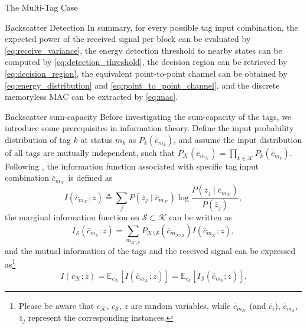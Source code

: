 \documentclass[journal]{IEEEtran}
\begin{document}
\begin{section}{The Multi-Tag Case}
\begin{subsection}{Backscatter Detection}
			In summary, for every possible tag input combination, the expected power of the received signal per block can be evaluated by \eqref{eq:receive_variance}, the energy detection threshold to nearby states can be computed by \eqref{eq:detection_threshold}, the decision region can be retrieved by \eqref{eq:decision_region}, the equivalent point-to-point channel can be obtained by \eqref{eq:energy_distribution} and \eqref{eq:point_to_point_channel}, and the discrete memoryless MAC can be extracted by \eqref{eq:mac}.
		\end{subsection}

		\begin{subsection}{Backscatter sum-capacity}
			Before investigating the sum-capacity of the tags, we introduce some prerequisites in information theory. Define the input probability distribution of tag $k$ at status $m_k$ as $P_k(\bar{c}_{m_k})$, and assume the input distribution of all tags are mutually independent, such that $P_{\mathcal{K}}(\bar{c}_{m_{\mathcal{K}}}) = \prod_{k \in \mathcal{K}} P_k(\bar{c}_{m_k})$. Following \cite{Rezaeian2004}, the information function associated with specific tag input combination $\bar{c}_{m_{\mathcal{K}}}$ is defined as
			\begin{equation}
				I(\bar{c}_{m_{\mathcal{K}}} ; z) \triangleq \sum_j P(\bar{z}_j \mid \bar{c}_{m_{\mathcal{K}}}) \log \frac{P(\bar{z}_j \mid \bar{c}_{m_{\mathcal{K}}})}{P(\bar{z}_j)},
				\label{eq:information_function}
			\end{equation}
			the marginal information function on $\mathcal{S} \subset \mathcal{K}$ can be written as
			\begin{equation}
				I_{\mathcal{S}}(\bar{c}_{m_{\mathcal{S}}} ; z) = \sum_{m_{\mathcal{K} \setminus \mathcal{S}}} P_{\mathcal{K} \setminus \mathcal{S}}(\bar{c}_{m_{\mathcal{K} \setminus \mathcal{S}}}) I(\bar{c}_{m_{\mathcal{K}}} ; z),
				\label{eq:marginal_information_function}
			\end{equation}
			and the mutual information of the tags and the received signal can be expressed as\footnote{Please be aware that $c_{\mathcal{K}}$, $c_{\mathcal{S}}$, $z$ are random variables, while $\bar{c}_{m_{\mathcal{K}}}$ (and $\bar{c}_i$), $\bar{c}_{m_{\mathcal{S}}}$, $\bar{z}_j$ represent the corresponding instances.}
			\begin{equation}
				I(c_{\mathcal{K}} ; z) = \mathbb{E}_{c_{\mathcal{K}}} \left[I(\bar{c}_{m_{\mathcal{K}}} ; z)\right] = \mathbb{E}_{c_{\mathcal{S}}} \left[I_{\mathcal{S}}(\bar{c}_{m_{\mathcal{S}}} ; z)\right].
			\end{equation}


\end{subsection}
\end{section}
\end{document}
